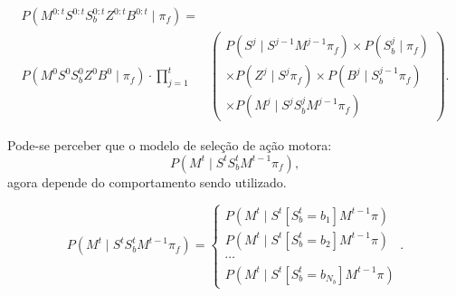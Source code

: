 \begin{equation}
	\begin{split}
        P \left( M^{0: t} S^{0: t} S_b^{0: t} Z^{0: t} B^{0: t} \mid \pi_f \right) = \\
        		P \left( M^0 S^0 S_b^0 Z^0 B^0 \mid \pi_f \right) \cdot \prod\limits_{j =1}^{t} 
        &\left(
            \begin{array}{l}
                P \left( S^j \mid S^{j -1} M^{j -1} \pi_f \right) \times P \left( S_b^j \mid \pi_f \right) \\
                \times P \left( Z^j \mid S^j \pi_f \right) \times P \left( B^j \mid S_b^{j-1} \pi_f \right) \\
                \times P \left( M^j \mid S^j S_b^j M^{j -1} \pi_f \right)
            \end{array}
        \right).
	\end{split}
\end{equation}


Pode-se perceber que o modelo de seleção de ação motora:
\begin{equation}
	P \left( M^t \mid S^t S_b^t M^{t-1} \pi_f \right),
\end{equation}
agora depende do comportamento sendo utilizado.

\begin{equation}
    P \left( M^t \mid S^t S_b^t M^{t-1} \pi_f \right) = 
        \left\{
            \begin{array}{l}
                P \left( M^t \mid S^t \left[ S_b^t=b_1 \right] M^{t-1} \pi \right) \\
                P \left( M^t \mid S^t \left[ S_b^t=b_2 \right] M^{t-1} \pi \right) \\
                \cdots \\
                P \left( M^t \mid S^t \left[ S_b^t=b_{N_b} \right] M^{t-1} \pi \right)
            \end{array}.
        \right.
\end{equation}

